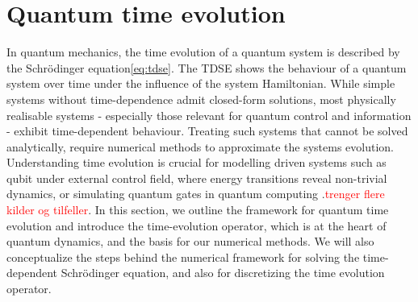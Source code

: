 \documentclass{subfiles}
\begin{document}
\section{Quantum time evolution}
In quantum mechanics, the time evolution of a quantum system is described by the Schrödinger equation\eqref{eq:tdse}. The TDSE shows the behaviour of a quantum system over time under the influence of the system Hamiltonian. While simple systems without time-dependence admit closed-form solutions, most physically realisable systems - especially those relevant for quantum control and information - exhibit time-dependent behaviour. Treating such systems that cannot be solved analytically, require numerical methods to approximate the systems evolution. Understanding time evolution is crucial for modelling driven systems such as qubit under external control field, where energy transitions reveal non-trivial dynamics\cite{landau1932theorie, zener1932non}, or simulating quantum gates in quantum computing \cite{leinonen2024coulomb, }.\textcolor{red}{trenger flere kilder og tilfeller}. In this section, we outline the framework for quantum time evolution and introduce the time-evolution operator, which is at the heart of quantum dynamics, and the basis for our numerical methods. We will also conceptualize the steps behind the numerical framework for solving the time-dependent Schrödinger equation, and also for discretizing the time evolution operator. \\
\end{document}
